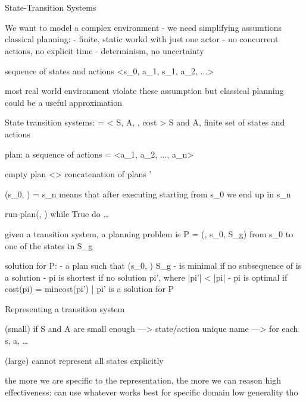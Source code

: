 \documentclass[11pt,a4paper]{article}
\theoremstyle{definition}
\theoremstyle{plain}
\theoremstyle{remark}
\begin{document}
\newpage
\tableofcontents
\newpage

\iffalse %

\part{}

\section{}

State-Transition Systems

We want to model a complex environment - we need simplifying assumtions
classical planning:
- finite, static workd with just one actor
- no concurrent actions, no explicit time
- determinism, no uncertainty

sequence of states and actions <s_0, a_1, s_1, a_2, ...>

most real world environment violate these assumption but classical planning could be a useful approximation

State transition systems: \Epsilon = < S, A, \gamma, cost >
S and A, finite set of states and actions

plan: a sequence of actions \pi = <a_1, a_2, ..., a_n>

empty plan <>
concatenation of plans \pi \circ \pi' 

\gamma(s_0, \pi) = s_n means that after executing \pi starting from s_0 we end up in s_n 

run-plan(\Epsilon, \pi) 
while True do
    \dots


given a transition system, a planning problem is P = (\Epsilon, s_0, S_g) 
from s_0 to one of the states in S_g 

solution for P:
- a plan \pi such that \gamma(s_0, \pi) \in S_g 
- \pi is minimal if no subsequence of \pi is a solution
- pi is shortest if no solution pi', where |pi'| < |pi| 
- pi is optimal if cost(pi) = min{cost(pi') | pi' is a solution for P}


Representing a transition system \Epsilon 

(small)
if S and A are small enough ---> state/action unique name ---> for each s, a, \dots

(large)
cannot represent all states explicitly 


the more we are specific to the representation, the more we can reason 
high effectiveness: can use whatever works best for specific domain
low generality tho 
\end{document}
